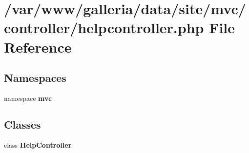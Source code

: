 \section{/var/www/galleria/data/site/mvc/controller/helpcontroller.php File Reference}
\label{helpcontroller_8php}
\subsection*{Namespaces}
\begin{CompactItemize}
\item 
namespace {\bf mvc}
\end{CompactItemize}
\subsection*{Classes}
\begin{CompactItemize}
\item 
class {\bf HelpController}
\end{CompactItemize}
